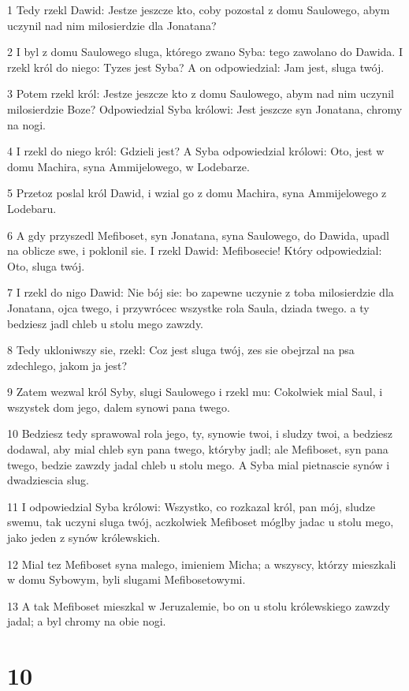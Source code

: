 \par 1 Tedy rzekl Dawid: Jestze jeszcze kto, coby pozostal z domu Saulowego, abym uczynil nad nim milosierdzie dla Jonatana?
\par 2 I byl z domu Saulowego sluga, którego zwano Syba: tego zawolano do Dawida. I rzekl król do niego: Tyzes jest Syba? A on odpowiedzial: Jam jest, sluga twój.
\par 3 Potem rzekl król: Jestze jeszcze kto z domu Saulowego, abym nad nim uczynil milosierdzie Boze? Odpowiedzial Syba królowi: Jest jeszcze syn Jonatana, chromy na nogi.
\par 4 I rzekl do niego król: Gdzieli jest? A Syba odpowiedzial królowi: Oto, jest w domu Machira, syna Ammijelowego, w Lodebarze.
\par 5 Przetoz poslal król Dawid, i wzial go z domu Machira, syna Ammijelowego z Lodebaru.
\par 6 A gdy przyszedl Mefiboset, syn Jonatana, syna Saulowego, do Dawida, upadl na oblicze swe, i poklonil sie. I rzekl Dawid: Mefibosecie! Który odpowiedzial: Oto, sluga twój.
\par 7 I rzekl do nigo Dawid: Nie bój sie: bo zapewne uczynie z toba milosierdzie dla Jonatana, ojca twego, i przywrócec wszystke rola Saula, dziada twego. a ty bedziesz jadl chleb u stolu mego zawzdy.
\par 8 Tedy ukloniwszy sie, rzekl: Coz jest sluga twój, zes sie obejrzal na psa zdechlego, jakom ja jest?
\par 9 Zatem wezwal król Syby, slugi Saulowego i rzekl mu: Cokolwiek mial Saul, i wszystek dom jego, dalem synowi pana twego.
\par 10 Bedziesz tedy sprawowal rola jego, ty, synowie twoi, i sludzy twoi, a bedziesz dodawal, aby mial chleb syn pana twego, któryby jadl; ale Mefiboset, syn pana twego, bedzie zawzdy jadal chleb u stolu mego. A Syba mial pietnascie synów i dwadziescia slug.
\par 11 I odpowiedzial Syba królowi: Wszystko, co rozkazal król, pan mój, sludze swemu, tak uczyni sluga twój, aczkolwiek Mefiboset móglby jadac u stolu mego, jako jeden z synów królewskich.
\par 12 Mial tez Mefiboset syna malego, imieniem Micha; a wszyscy, którzy mieszkali w domu Sybowym, byli slugami Mefibosetowymi.
\par 13 A tak Mefiboset mieszkal w Jeruzalemie, bo on u stolu królewskiego zawzdy jadal; a byl chromy na obie nogi.

\chapter{10}

